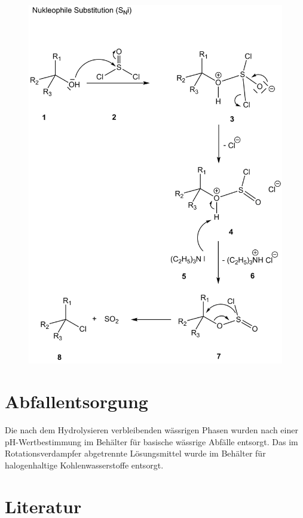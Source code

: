 \documentclass[12pt]{article}
\begin{document}
\begin{onehalfspace}
\begin{figure}[!htbp]
\centering
\includegraphics[width=\textwidth]{mechan.png}
\end{figure}
\newpage    

\section{Abfallentsorgung}
Die nach dem Hydrolysieren verbleibenden wässrigen Phasen wurden
nach einer pH-Wertbestimmung im Behälter für basische wässrige Abfälle entsorgt.
Das im Rotationsverdampfer abgetrennte Lösungsmittel wurde im Behälter für halogenhaltige Kohlenwasserstoffe entsorgt.
\section{Literatur}


\end{onehalfspace}
\end{document}
